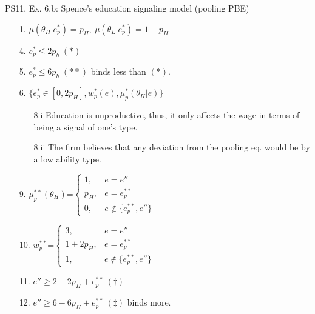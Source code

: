 \begin{frame}{PS11, Ex. 6.b: Spence’s education signaling model (pooling PBE)}
\begin{multicols}{2}
\begin{enumerate}
        \item[1.] $\mu\left(\theta_H|e_p^*\right)=p_H,\
               \mu\left(\theta_L|e_p^*\right)=1-p_H$
        \item[4.] $e_p^*\leq2p_h\ (*)$
        \item[5.] $e_p^*\leq6p_h\ (**)$ binds less than $(*)$.
        \item[6.] $\{e_p^*\in[0,2p_H],w_p^*(e),\mu_p^*(\theta_H|e)\}$
        \begin{itemize}\normalsize
          \item[8.i] Education is unproductive, thus, it only affects the wage in terms of being a signal of one's type.
          \item[8.ii] The firm believes that any deviation from the pooling eq. would be by a low ability type.
        \end{itemize}
        \item[9.] $\mu_p^{**}(\theta_H)$=$\left\{\begin{array}{rl}
                      1, & e = e'' \\
                      p_H, & e = e_p^{**} \\
                      0, & e \notin \{e_p^{**},e''\}
                    \end{array}\right.$
        \item[10.] $w_p^{**}$=$\left\{\begin{array}{rl}
                      3, & e = e'' \\
                      1+2p_H, & e = e_p^{**} \\
                      1, & e \notin \{e_p^{**},e''\}
                    \end{array}\right.$
        \item[11.] $e'' \geq 2-2p_H+e_p^{**}\ (\dagger)$
        \item[12.] $e'' \geq 6-6p_H+e_p^{**}\ (\ddagger)$ binds more.
      \end{enumerate}
      \vfill\null
    \end{multicols}
\end{frame}
